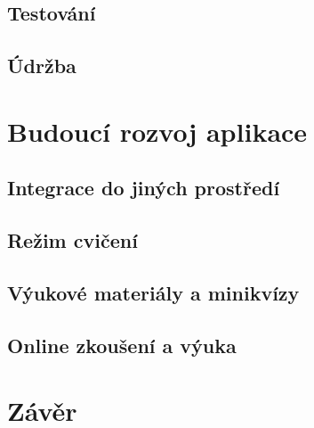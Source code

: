 \documentclass[14pt,a4paper]{article}
\begin{document}
        \subsection{Testování}
        \subsection{Údržba}
        
	\section{Budoucí rozvoj aplikace}
        \subsection{Integrace do jiných prostředí}
        \subsection{Režim cvičení}
        \subsection{Výukové materiály a minikvízy}
        \subsection{Online zkoušení a výuka}
	
	\section{Závěr}
	
	

\printbibliography
\end{document}
